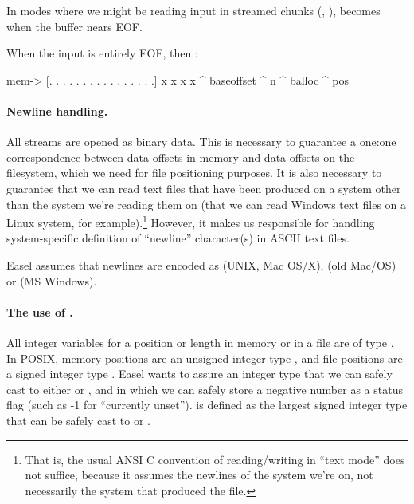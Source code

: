 In modes where we might be reading input in streamed chunks
(, 
),  becomes 
when the buffer nears EOF.

When the input is entirely EOF, then :

\begin{cchunk}
  mem->  {[. . . . . . . . . . . . . . . .] x x x x}
           ^ baseoffset                     ^ n   ^ balloc
                                            ^ pos
\end{cchunk}


\paragraph{Newline handling.}

All streams are opened as binary data. This is necessary to guarantee
a one:one correspondence between data offsets in memory and data
offsets on the filesystem, which we need for file positioning
purposes. It is also necessary to guarantee that we can read text
files that have been produced on a system other than the system we're
reading them on (that we can read Windows text files on a Linux
system, for example).\footnote{That is, the usual ANSI C convention of
  reading/writing in ``text mode'' does not suffice, because it
  assumes the newlines of the system we're on, not necessarily the
  system that produced the file.}  However, it makes us responsible
for handling system-specific definition of ``newline'' character(s) in
ASCII text files.

Easel assumes that newlines are encoded as \ccode{\n} (UNIX, Mac
OS/X), \ccode{\r} (old Mac/OS) or \ccode{\r\n} (MS Windows).



\paragraph{ The use of . }

All integer variables for a position or length in memory or in a file
are of type . In POSIX, memory positions are an
unsigned integer type , and file positions are a signed
integer type . Easel wants to assure an integer type
that we can safely cast to either  or ,
and in which we can safely store a negative number as a status flag
(such as -1 for ``currently unset'').  is defined
as the largest signed integer type that can be safely cast to
 or .
